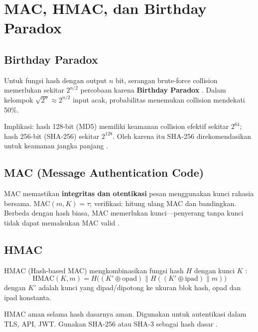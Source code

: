 \section{MAC, HMAC, dan Birthday Paradox}

\subsection{Birthday Paradox}

Untuk fungsi hash dengan output $n$ bit, serangan brute-force collision memerlukan sekitar $2^{n/2}$ percobaan karena \textbf{Birthday Paradox} \cite{stallings2017}. Dalam kelompok $\sqrt{2^n} \approx 2^{n/2}$ input acak, probabilitas menemukan collision mendekati 50\%.

Implikasi: hash 128-bit (MD5) memiliki keamanan collision efektif sekitar $2^{64}$; hash 256-bit (SHA-256) sekitar $2^{128}$. Oleh karena itu SHA-256 direkomendasikan untuk keamanan jangka panjang \cite{menezes1996}.

\subsection{MAC (Message Authentication Code)}

MAC memastikan \textbf{integritas dan otentikasi} pesan menggunakan kunci rahasia bersama. MAC$(m, K) = \tau$; verifikasi: hitung ulang MAC dan bandingkan. Berbeda dengan hash biasa, MAC memerlukan kunci—penyerang tanpa kunci tidak dapat memalsukan MAC valid \cite{stallings2017}.

\subsection{HMAC}

HMAC (Hash-based MAC) mengkombinasikan fungsi hash $H$ dengan kunci $K$ \cite{stallings2017}:
\[
\text{HMAC}(K, m) = H\bigl( (K' \oplus \text{opad}) \| H( (K' \oplus \text{ipad}) \| m ) \bigr)
\]
dengan $K'$ adalah kunci yang dipad/dipotong ke ukuran blok hash, opad dan ipad konstanta.

HMAC aman selama hash dasarnya aman. Digunakan untuk autentikasi dalam TLS, API, JWT. Gunakan SHA-256 atau SHA-3 sebagai hash dasar \cite{menezes1996}.
